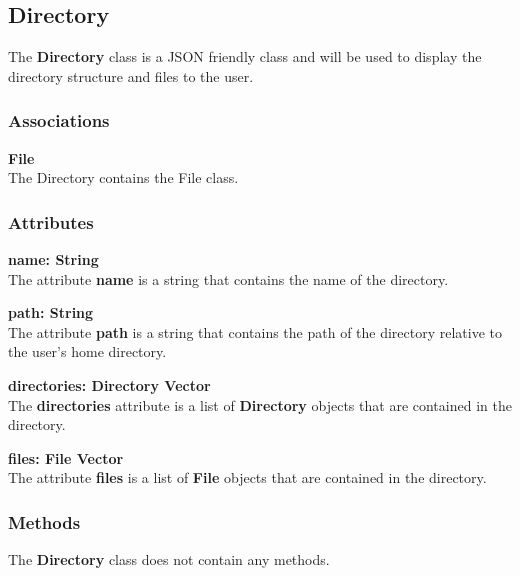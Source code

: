 \subsection{Directory}
The \textbf{Directory} class is a JSON friendly class and will be used to display the directory
structure and files to the user.

\subsubsection{Associations}
\textbf{File} \\
The Directory contains the File class.

\subsubsection{Attributes}
\textbf{name: String} \\
The attribute \textbf{name} is a string that contains the name of the directory.

\textbf{path: String} \\
The attribute \textbf{path} is a string that contains the path of the directory
relative to the user's home directory.

\textbf{directories: Directory Vector} \\
The \textbf{directories} attribute is a list of \textbf{Directory} objects that
are contained in the directory.

\textbf{files: File Vector} \\
The attribute \textbf{files} is a list of \textbf{File} objects that are contained
in the directory.

\subsubsection{Methods}
The \textbf{Directory} class does not contain any methods.

